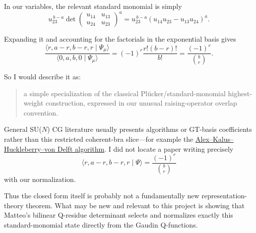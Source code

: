 \documentclass[11pt]{article}
\begin{document}
In our variables, the relevant standard monomial is simply
\[
  u_{23}^{\,b-a}
  \det\begin{pmatrix}
    u_{14}&u_{13}\\
    u_{24}&u_{23}
  \end{pmatrix}^{a}
  =u_{23}^{\,b-a}(u_{14}u_{23}-u_{13}u_{24})^a.
\]

Expanding it and accounting for the factorials in the exponential basis gives
\[
  \frac{\langle r,a-r,b-r,r\mid\Psi_\mu\rangle}
       {\langle0,a,b,0\mid\Psi_\mu\rangle}
  =(-1)^r\frac{r!(b-r)!}{b!}
  =\frac{(-1)^r}{\binom{b}{r}}.
\]

So I would describe it as:
\begin{quote}
  a simple specialization of the classical Pl\"ucker/standard-monomial highest-weight
  construction, expressed in our unusual raising-operator overlap convention.
\end{quote}

General SU(\(N\)) CG literature usually presents algorithms or GT-basis coefficients rather than
this restricted coherent-bra slice---for example the
\href{https://arxiv.org/abs/1009.0437}{Alex--Kalus--Huckleberry--von Delft algorithm}.
I did not locate a paper writing precisely
\[
  \langle r,a-r,b-r,r\mid\Psi\rangle
  =\frac{(-1)^r}{\binom{b}{r}}
\]
with our normalization.

Thus the closed form itself is probably not a fundamentally new representation-theory theorem.
What may be new and relevant to this project is showing that Matteo's bilinear Q-residue
determinant selects and normalizes exactly this standard-monomial state directly from the Gaudin
Q-functions.
\end{document}
